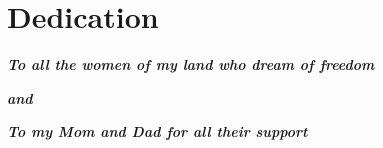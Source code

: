 \chapter*{Dedication }



\textit{\textbf{To all the women of my land who dream of freedom}}


\textit{\textbf{and}}


\textit{\textbf{To my Mom and Dad for all their support}}

